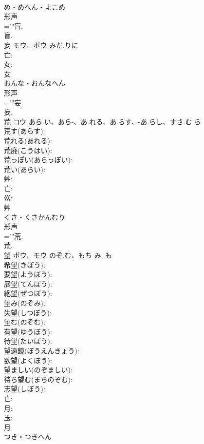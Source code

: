 \documentclass[8pt]{extreport}
\begin{document}
\begin{CJK}{UTF8}{min}
\\	め・めへん・よこめ	
\\	形声 
\\	=""盲.
\\	盲.
\\	妄	モウ、ボウ	みだ.りに		
\\	亡: 
\\	女: 
\\	女	
\\	おんな・おんなへん	
\\	形声 
\\	=""妄.
\\	妄.
\\	荒	コウ	あら.い、あら-、あ.れる、あ.らす、-あ.らし、すさ.む	ら	
\\	荒す(あらす): 
\\	荒れる(あれる): 
\\	荒廃(こうはい): 
\\	荒っぽい(あらっぽい): 
\\	荒い(あらい): 
\\	艸: 
\\	亡: 
\\	巛: 
\\	艸	
\\	くさ・くさかんむり	
\\	形声 
\\	=""荒.
\\	荒.
\\	望	ボウ、モウ	のぞ.む、もち	み, も	
\\	希望(きぼう): 
\\	要望(ようぼう): 
\\	展望(てんぼう): 
\\	絶望(ぜつぼう): 
\\	望み(のぞみ): 
\\	失望(しつぼう): 
\\	望む(のぞむ): 
\\	有望(ゆうぼう): 
\\	待望(たいぼう): 
\\	望遠鏡(ぼうえんきょう): 
\\	欲望(よくぼう): 
\\	望ましい(のぞましい): 
\\	待ち望む(まちのぞむ): 
\\	志望(しぼう): 
\\	亡: 
\\	月: 
\\	玉: 
\\	月	
\\	つき・つきへん	

\end{CJK}
\end{document}
